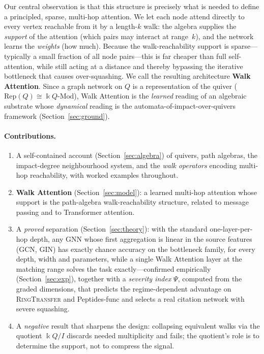 \documentclass[runningheads]{llncs}
\newcommand{\kk}{\Bbbk}
\newcommand{\kQ}{\kk Q}
\begin{document}
Our central observation is that this structure is precisely what is needed to
define a principled, sparse, multi-hop attention. We let each node attend
directly to every vertex reachable from it by a length-$k$ walk: the algebra
supplies the \emph{support} of the attention (which pairs may interact at
range~$k$), and the network learns the \emph{weights} (how much). Because the
walk-reachability support is sparse---typically a small fraction of all node
pairs---this is far cheaper than full self-attention, while still acting at a
distance and thereby bypassing the iterative bottleneck that causes
over-squashing. We call the resulting architecture \textbf{Walk Attention}.
Since a graph network on $Q$ is a representation of the quiver
($\mathrm{Rep}(Q)\cong\kQ\text{-}\mathrm{Mod}$), Walk Attention is the
\emph{learned} reading of an algebraic substrate whose \emph{dynamical} reading
is the automata-of-impact-over-quivers framework \cite{zainea2026aiq}
(Section~\ref{sec:ground}).

\paragraph{Contributions.}
\begin{enumerate}
  \item A self-contained account (Section~\ref{sec:algebra}) of quivers, path
  algebras, the impact-degree neighbourhood system, and the \emph{walk
  operators} encoding multi-hop reachability, with worked examples throughout.
  \item \textbf{Walk Attention} (Section~\ref{sec:model}): a learned multi-hop
  attention whose support is the path-algebra walk-reachability structure,
  related to message passing and to Transformer attention.
  \item A \emph{proved} separation (Section~\ref{sec:theory}): with the
  standard one-layer-per-hop depth, any GNN whose first aggregation is linear
  in the source features (GCN, GIN) has exactly chance accuracy on the
  bottleneck family, for every depth, width and parameters, while a single Walk
  Attention layer at the matching range solves the task exactly---confirmed
  empirically (Section~\ref{sec:exp}), together with a \emph{severity index}
  $\Psi$, computed from the graded dimensions, that predicts the
  regime-dependent advantage on \textsc{RingTransfer} and Peptides-func and
  selects a real citation network with severe squashing.
  \item A \emph{negative} result that sharpens the design: collapsing
  equivalent walks via the quotient $\kQ/I$ discards needed multiplicity and
  fails; the quotient's role is to determine the support, not to compress the
  signal.
\end{enumerate}
\end{document}
